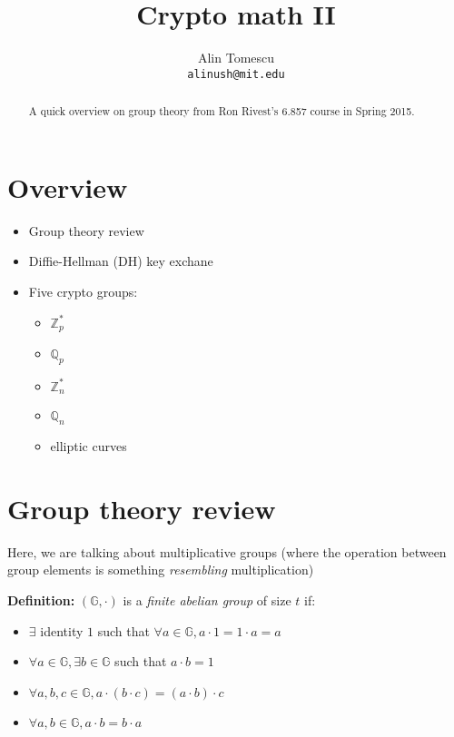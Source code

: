 \documentclass[11pt]{article}
\newcommand{\Zp}{\mathbb{Z}^{\ast}_p}
\newcommand{\Zn}{\mathbb{Z}^{\ast}_n}
\newcommand{\Qp}{\mathbb{Q}_p}
\newcommand{\Qn}{\mathbb{Q}_n}
\newcommand{\G}{\mathbb{G}}
\newcommand{\definition}{\textbf{Definition:} }
\begin{document}
\title{Crypto math II}
\author{Alin Tomescu\\
  \texttt{alinush@mit.edu}}

\maketitle

\begin{abstract}
A quick overview on group theory from Ron Rivest's 6.857 course in Spring 2015.
\end{abstract}

\section{Overview}

\begin{itemize}
  \item Group theory review
  \item Diffie-Hellman (DH) key exchane
  \item Five crypto groups:
  \begin{itemize}
    \item $\Zp$
    \item $\Qp$
    \item $\Zn$
    \item $\Qn$
    \item elliptic curves
  \end{itemize}
\end{itemize}

\section{Group theory review}

Here, we are talking about multiplicative groups (where the operation between
group elements is something \emph{resembling} multiplication)

\definition $(\G, \cdot)$ is a \emph{finite abelian group} of size $t$ if:

\begin{itemize}
  \item $\exists$ identity $1$ such that $\forall a \in \G, a\cdot 1 = 1\cdot a = a$
  \item $\forall a     \in \G, \exists b \in \G$ such that $a\cdot b = 1$
  \item $\forall a,b,c \in \G, a\cdot (b\cdot c) = (a\cdot b)\cdot c$
  \item $\forall a,b   \in \G, a\cdot b = b\cdot a$
\end{itemize}
\end{document}
